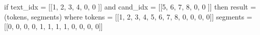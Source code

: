 \begin{DoxyVerb}if text_idx = [[1, 2, 3, 4, 0, 0  ]]
        and cand_idx = [[5, 6, 7, 8, 0, 0 ]]
        then result = (tokens, segments) where
        tokens = [[1, 2, 3, 4, 5, 6, 7, 8, 0, 0, 0, 0]]
        segments = [[0, 0, 0, 0, 1, 1, 1, 1, 0, 0, 0, 0]]\end{DoxyVerb}
 
